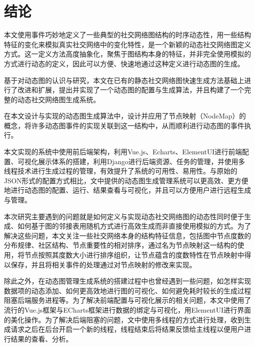 
\chapter{结论}
\label{cha:chapter99}

本文使用事件巧妙地定义了一些典型的社交网络图结构的时序动态性，用一些结构特征的变化来模拟真实社交网络中的变化特性，是一个新颖的动态社交网络图定义方式。这一定义方法高度抽象化，聚焦于图结构本身的特征，并非完全使用模拟的方式进行动态的定义，因此可以方便、快速地通过这种定义进行动态图的生成。

基于对动态图的认识与研究，本文在已有的静态社交网络图快速生成方法\cite{FastSGG}基础上进行了改进和扩展，提出并实现了一个动态图的配置与生成算法，并且构建了一个完整的动态社交网络图生成系统。

在本文设计与实现的动态图生成算法中，设计并应用了节点映射（NodeMap）的概念，将许多动态图事件的实现关联到这一结构中，从而顺利进行动态图的事件执行。


本文实现的系统中使用前后端架构，利用Vue.js、Echarts、ElementUI进行前端配置、可视化展示体系的搭建，利用Django进行后端资源、任务的管理，并使用多线程技术进行生成过程的管理，有效提升了系统的可用性、易用性。与原始的JSON形式的配置方式相比，文中提供的动态图生成管理系统可以更高效、更方便地进行动态图的配置、运行、结果查看与可视化，并且可以方便用户进行远程生成与管理。


本次研究主要遇到的问题就是如何定义与实现动态社交网络图的动态性同时便于生成、如何基于图的邻接表用随机方式进行高效生成而非直接使用模拟的方式。为了解决这些问题，本文关注一些社交网络本身的结构特征信息，包括图中节点度数的分布规律、社区结构、节点重要性的相对排序，通过名为节点映射这一结构的使用，将节点按照其度数大小进行排序组织，让节点蕴含的度数特性在节点映射中得以保存，并且将相关事件的处理通过对节点映射的修改来实现。

除此之外，在动态图管理生成系统的搭建过程中也曾经遇到一些问题，如怎样实现数据项的动态添加、如何更高效地进行图的可视化、如何避免耗时较长的生成过程阻塞后端服务进程等。为了解决前端配置与可视化展示的相关问题，本文中使用了流行的Vue.js框架与ECharts框架进行数据的绑定与可视化，用ElementUI进行界面的美化操作。为了解决后端阻塞的问题，文中使用多线程的方式进行处理，收到生成请求之后在后台开启一个新的线程，线程结束后将结果反馈给主线程以便用户进行结果的查看、分析。

